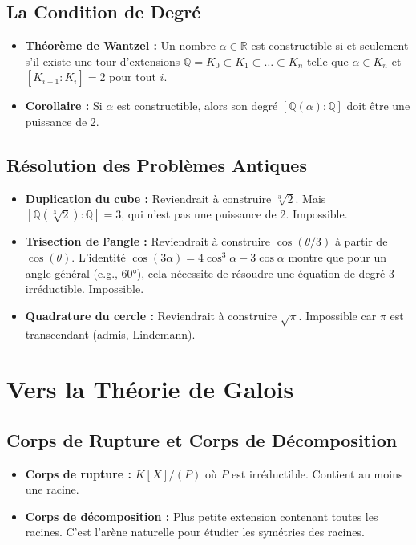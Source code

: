 \documentclass[12pt, a4paper, parskip=full]{report}
\theoremstyle{agregstyle}
\begin{document}
\subsection{La Condition de Degré}
\begin{itemize}
    \item \textbf{Théorème de Wantzel :} Un nombre $\alpha \in \mathbb{R}$ est constructible si et seulement s'il existe une tour d'extensions $\mathbb{Q}=K_0 \subset K_1 \subset \dots \subset K_n$ telle que $\alpha \in K_n$ et $[K_{i+1}:K_i]=2$ pour tout $i$.
    \item \textbf{Corollaire :} Si $\alpha$ est constructible, alors son degré $[\mathbb{Q}(\alpha):\mathbb{Q}]$ doit être une puissance de 2.
\end{itemize}
\subsection{Résolution des Problèmes Antiques}
\begin{itemize}
    \item \textbf{Duplication du cube :} Reviendrait à construire $\sqrt[3]{2}$. Mais $[\mathbb{Q}(\sqrt[3]{2}):\mathbb{Q}]=3$, qui n'est pas une puissance de 2. Impossible.
    \item \textbf{Trisection de l'angle :} Reviendrait à construire $\cos(\theta/3)$ à partir de $\cos(\theta)$. L'identité $\cos(3\alpha)=4\cos^3\alpha - 3\cos\alpha$ montre que pour un angle général (e.g., 60°), cela nécessite de résoudre une équation de degré 3 irréductible. Impossible.
    \item \textbf{Quadrature du cercle :} Reviendrait à construire $\sqrt{\pi}$. Impossible car $\pi$ est transcendant (admis, Lindemann).
\end{itemize}

\section{Vers la Théorie de Galois}
\subsection{Corps de Rupture et Corps de Décomposition}
\begin{itemize}
    \item \textbf{Corps de rupture :} $K[X]/(P)$ où $P$ est irréductible. Contient au moins une racine.
    \item \textbf{Corps de décomposition :} Plus petite extension contenant toutes les racines. C'est l'arène naturelle pour étudier les symétries des racines.
\end{itemize}
\end{document}
